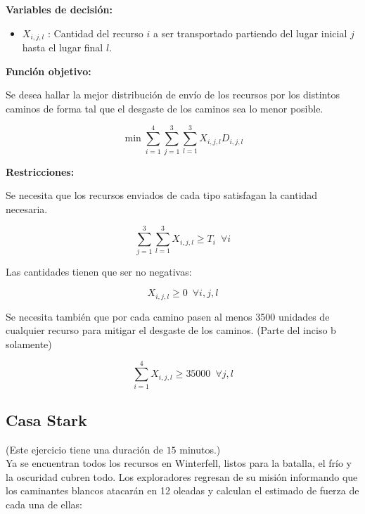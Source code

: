 \documentclass[a4paper,10pt,twocolumn]{article}
\theoremstyle{theorem}
\theoremstyle{definition}
\theoremstyle{remark}
\begin{document}
\textbf{Variables de decisión:}

\begin{itemize}
\item $X_{i,j,l}$ : Cantidad del recurso $i$ a ser transportado partiendo del lugar inicial $j$ hasta el lugar final $l$.
\end{itemize}

\textbf{Función objetivo:}

Se desea hallar la mejor distribución de envío de los recursos por los distintos caminos de forma tal que el desgaste de los caminos sea lo menor posible.

$$
\min \sum^{4}_{i=1} \sum^{3}_{j=1} \sum^{3}_{l=1} X_{i, j, l} D_{i, j, l}
$$

\textbf{Restricciones:}

Se necesita que los recursos enviados de cada tipo satisfagan la cantidad necesaria.

$$
\sum^{3}_{j=1} \sum^{3}_{l=1} X_{i, j, l} \geq T_{i} \enspace \forall i
$$

Las cantidades tienen que ser no negativas:

$$
X_{i, j, l} \geq 0 \enspace \forall i, j, l
$$

Se necesita también que por cada camino pasen al menos 3500 unidades de cualquier recurso para mitigar el desgaste de los caminos. (Parte del inciso b solamente)

$$
\sum^{4}_{i=1} X_{i, j, l} \geq 35000 \enspace \forall j, l
$$

	\subsection{Casa Stark}\label{subsec:ejer_5}
(Este ejercicio tiene una duración de $15$ minutos.)\\

Ya se encuentran todos los recursos en Winterfell, listos para la batalla, el frío y la oscuridad cubren todo. Los exploradores regresan de su misión informando que los caminantes blancos atacarán en 12 oleadas y calculan el estimado de fuerza de cada una de ellas:
\end{document}
